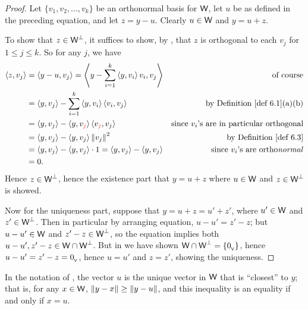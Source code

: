 \begin{proof}
Let \(\{ v_1, v_2, ..., v_k \}\) be an orthonormal basis for \(\textsf{W}\), let \(u\) be as defined in the preceding equation, and let \(z = y - u\). Clearly \(u \in \textsf{W}\) and \(y = u + z\).

To show that \(z \in \textsf{W}^{\perp}\), it suffices to show, by , that \(z\) is orthogonal to each \(v_j\) for \(1 \le j \le k\).
So for any \(j\), we have
\begin{align*}
    \LG z, v_j \RG & = \LG y - u, v_j \RG = \LG y - \sum_{i = 1}^k \LG y, v_i \RG v_i, v_j \RG & \text{of course} \\
        & = \LG y, v_j \RG - \sum_{i = 1}^k \LG y, v_i \RG \LG v_i, v_j \RG & \text{by \DEF{6.1}(a)(b)} \\
        & = \LG y, v_j \RG - \LG y, v_{\RED{j}} \RG \LG v_{\RED{j}}, v_j \RG & \text{since \(v_i\)'s are in particular orthogonal} \\
        & = \LG y, v_j \RG - \LG y, v_{j} \RG \norm{v_j}^2 & \text{by \DEF{6.3}} \\
        & = \LG y, v_j \RG - \LG y, v_{j} \RG \cdot 1 = \LG y, v_j \RG - \LG y, v_{j} \RG & \text{since \(v_i\)'s are ortho\emph{normal}} \\
        & = 0.
\end{align*}
Hence \(z \in \textsf{W}^{\perp}\), hence the existence part that \(y = u + z\) where \(u \in \textsf{W}\) and \(z \in \textsf{W}^{\perp}\) is showed.

Now for the uniqueness part, suppose that \(y = u + z = u' + z'\), where \(u' \in \textsf{W}\) and \(z' \in \textsf{W}^{\perp}\).
Then in particular by arranging equation, \(u - u' = z'- z\); but \(u - u' \in \textsf{W}\) and \(z' - z \in \textsf{W}^{\perp}\), so the equation implies both \(u - u', z' - z \in \textsf{W} \cap \textsf{W}^{\perp}\).
But in  we have shown \(\textsf{W} \cap \textsf{W}^{\perp} = \{ 0_{_{\textsf{V}}} \}\), hence \(u - u' = z' - z = 0_{_{\textsf{V}}}\), hence \(u = u'\) and \(z = z'\), showing the uniqueness.
\end{proof}

\begin{corollary} \label{corollary 6.6.1}
In the notation of , the vector \(u\) is the unique vector in \(\textsf{W}\) that is ``closest'' to \(y\);
that is, for any \(x \in \textsf{W}\), \(\left\lVert y - x\right\rVert \ge \left\lVert y - u\right\rVert\), and this inequality is an equality if and only if \(x = u\).
\end{corollary}

